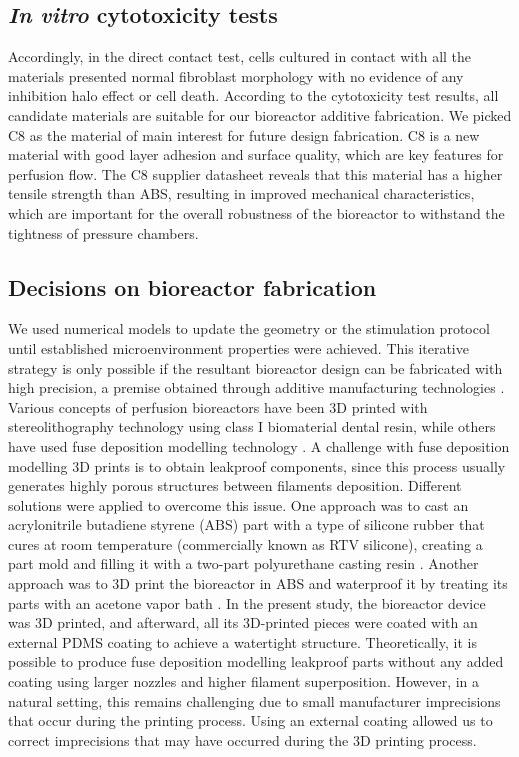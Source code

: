 \subsection{\textit{In vitro} cytotoxicity tests}
Accordingly, in the direct contact test, cells cultured in contact with all the materials presented normal fibroblast morphology with no evidence of any inhibition halo effect or cell death. According to the cytotoxicity test results, all candidate materials are suitable for our bioreactor additive fabrication. We picked \acs{C8} as the material of main interest for future design fabrication. \acs{C8} is a new material with good layer adhesion and surface quality, which are key features for perfusion flow. The \acs{C8} supplier datasheet reveals that this material has a higher tensile strength than ABS, resulting in improved mechanical characteristics, which are important for the overall robustness of the bioreactor to withstand the tightness of pressure chambers.


\subsection{Decisions on bioreactor fabrication}
We used numerical models to update the geometry or the stimulation protocol until established microenvironment properties were achieved. This iterative strategy is only possible if the resultant bioreactor design can be fabricated with high precision, a premise obtained through additive manufacturing technologies \cite{Gensler2020-in}. Various concepts of perfusion bioreactors \cite{Smith2018-he, Daneshgar2019-tu, Gabetti2022-hp, Birru2018-rj} have been \acs{3D} printed with stereolithography technology using class I biomaterial dental resin, while others have used fuse deposition modelling technology \cite{Rosser2018-zg, Schmid2018-rg, Raveling2018-gl}. A challenge with fuse deposition modelling 3D prints is to obtain leakproof components, since this process usually generates highly porous structures between filaments deposition. Different solutions were applied to overcome this issue. One approach was to cast an acrylonitrile butadiene styrene (ABS) part with a type of silicone rubber that cures at room temperature (commercially known as RTV silicone), creating a part mold and filling it with a two-part polyurethane casting resin \cite{Rosser2018-zg, Schmid2018-rg}. Another approach was to 3D print the bioreactor in ABS and waterproof it by treating its parts with an acetone vapor bath \cite{Raveling2018-gl}. In the present study, the bioreactor device was 3D printed, and afterward, all its 3D-printed pieces were coated with an external PDMS coating to achieve a watertight structure. Theoretically, it is possible to produce fuse deposition modelling leakproof parts without any added coating using larger nozzles and higher filament superposition. However, in a natural setting, this remains challenging due to small manufacturer imprecisions that occur during the printing process. Using an external coating allowed us to correct imprecisions that may have occurred during the 3D printing process.


